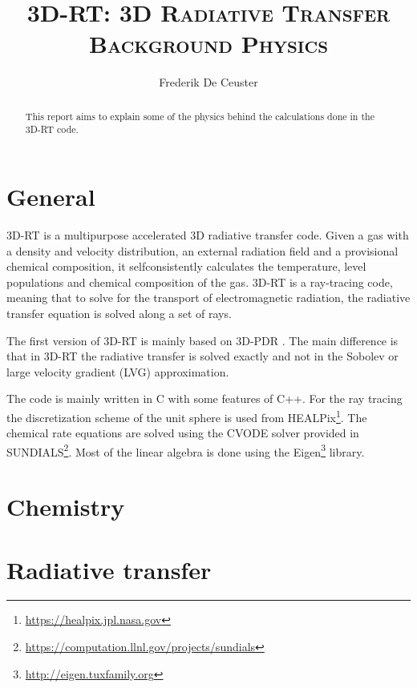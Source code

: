 \documentclass[]{article}
\title{\vspace{0cm} \huge \textsc{3D-RT: 3D Radiative Transfer} \\
                \vskip3mm \textsc{ Background Physics} }
\author{\large Frederik De Ceuster}
\date{}
\begin{document}
\maketitle

\vskip5cm

\begin{abstract}
This report aims to explain some of the physics behind the calculations done in the 3D-RT code.
\end{abstract}

\vskip5cm

\tableofcontents

\newpage


\section{General}

3D-RT is a multipurpose accelerated 3D radiative transfer code. Given a gas with a density and velocity distribution, an external radiation field and a provisional chemical composition, it selfconsistently calculates the temperature, level populations and chemical composition of the gas. 3D-RT is a ray-tracing code, meaning that to solve for the transport of electromagnetic radiation, the radiative transfer equation is solved along a set of rays.

\bigskip

The first version of 3D-RT is mainly based on 3D-PDR \cite{3DPDR}. The main difference is that in 3D-RT the radiative transfer is solved exactly and not in the Sobolev or large velocity gradient (LVG) approximation.

\bigskip

The code is mainly written in C with some features of C++. For the ray tracing the discretization scheme of the unit sphere is used from HEALPix\footnote{\url{https://healpix.jpl.nasa.gov}}. The chemical rate equations are solved using the CVODE solver provided in SUNDIALS\footnote{\url{https://computation.llnl.gov/projects/sundials}}. Most of the linear algebra is done using the Eigen\footnote{\url{http://eigen.tuxfamily.org}} library.



\section{Chemistry}


\section{Radiative transfer}
\end{document}
